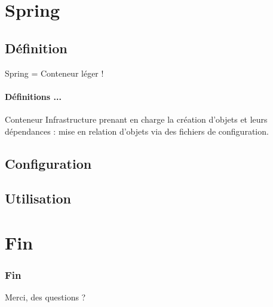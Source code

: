 \documentclass[compress]{beamer}%
\begin{document}
\section{Spring}

\subsection{Définition}


\begin{frame}{Spring = Conteneur léger !}
	\framesubtitle{Définitions ...}
	
	\begin{block}{Conteneur}
	Infrastructure prenant en charge la création d'objets et leurs dépendances : mise en relation d'objets via des fichiers de configuration.
	\end{block}

\end{frame}


\subsection{Configuration}



\subsection{Utilisation}




\section*{Fin}

\begin{frame}
	\frametitle{Fin}
	\begin{center}
		\huge
		Merci, des questions ?
	\end{center}
\end{frame}
\end{document}
